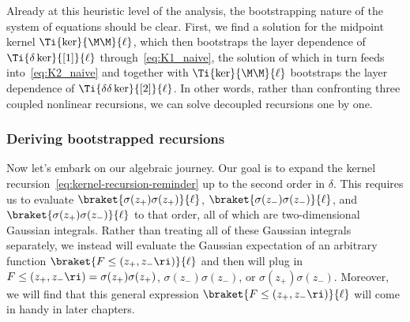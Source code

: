 Already at this heuristic level of the analysis, the bootstrapping nature of the system of equations should be clear. First, we find a solution for the midpoint kernel $\Ti{\ker}{\M\M}{\ell}$, which then bootstraps the layer dependence of $\Ti{\delta \ker}{[1]}{\ell}$ through~\eqref{eq:K1_naive}, the solution of which in turn feeds into~\eqref{eq:K2_naive} and together with $\Ti{\ker}{\M\M}{\ell}$ bootstraps the layer dependence of $\Ti{\delta\delta \ker}{[2]}{\ell}$. In other words, rather than confronting three coupled nonlinear recursions, we can solve decoupled recursions one by one.











































\subsubsection{Deriving bootstrapped recursions}
Now let's embark on our algebraic journey. Our goal is to expand the kernel recursion~\eqref{eq:kernel-recursion-reminder} up to the second order in $\delta$. This requires us to evaluate $\braket{\sigma(z_+) \sigma(z_+)}{\ell}$, $\braket{\sigma(z_-) \sigma(z_-)}{\ell}$, and $\braket{\sigma(z_+) \sigma(z_-)}{\ell}$ to that order, all of which are two-dimensional Gaussian integrals. Rather than treating all of these Gaussian integrals separately, we instead will evaluate the Gaussian expectation of an arbitrary function $\braket{F\le(z_{+},z_{-}\ri)}{\ell}$ and then  will plug in $F\le(z_{+},z_{-}\ri)=\sigma(z_+) \sigma(z_+)$, $\sigma(z_-) \sigma(z_-)$, or $\sigma(z_+) \sigma(z_-)$.  Moreover, we will find that this general expression $\braket{F\le(z_{+},z_{-}\ri)}{\ell}$ will come in handy
in later chapters.

